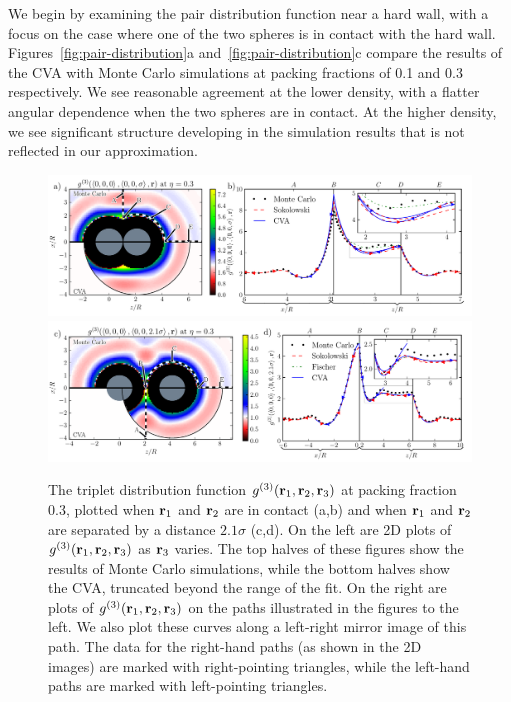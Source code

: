 We begin by examining the pair distribution function near a hard wall,
with a focus on the case where one of the two spheres is in contact
with the hard wall.  Figures~\ref{fig:pair-distribution}a
and~\ref{fig:pair-distribution}c compare the results of the CVA with
Monte Carlo simulations at packing fractions of 0.1 and 0.3
respectively. We see reasonable agreement at the lower density, with a flatter angular
dependence when the two spheres are in contact.  At the higher
density, we see significant structure developing in the simulation
results that is not reflected in our approximation.

\begin{figure}
  \includegraphics[width=\textwidth]{figs/triplet-correlation-pretty-contact-3.pdf}
  \vspace{-0.7cm}
\\
  \includegraphics[width=\textwidth]{figs/triplet-correlation-pretty-inbetween-3.pdf}
  \vspace{-0.7cm}
  \caption{The triplet distribution function
    $g^{(3)}(\textbf{r}_1,\textbf{r}_2,\textbf{r}_3)$ at packing fraction 0.3, plotted when
    $\textbf{r}_1$ and $\textbf{r}_2$ are in contact (a,b) and when $\textbf{r}_1$ and
    $\textbf{r}_2$ are separated by a distance $2.1\sigma$ (c,d). On the left
    are 2D plots of $g^{(3)}(\textbf{r}_1,\textbf{r}_2,\textbf{r}_3)$ as $\textbf{r}_3$
    varies. %
%
    The top halves of these figures show the results of Monte Carlo
    simulations, while the bottom halves show the CVA, truncated
    beyond the range of the fit.  On the right
    are plots of $g^{(3)}(\textbf{r}_1,\textbf{r}_2,\textbf{r}_3)$ on the paths illustrated
    in the figures to the left.
%
    We also plot these curves along a left-right mirror image of this
    path.  The data for the right-hand paths (as shown in the 2D
    images) are marked with right-pointing triangles, while the
    left-hand paths are marked with left-pointing triangles.
%
  }
  \label{fig:triplet-contact-distribution}
\end{figure}

